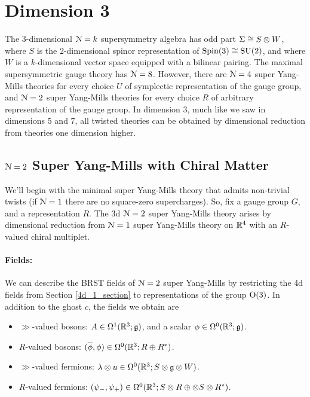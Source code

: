 \documentclass[10pt, oneside]{article}
\begin{document}

\section{Dimension 3}
The 3-dimensional $\mathcal{N}=k$ supersymmetry algebra has odd part $\Sigma \cong S \otimes W$, where $S$ is the 2-dimensional spinor representation of $\mathrm{Spin}(3) \cong \mathrm{SU}(2)$, and where $W$ is a $k$-dimensional vector space equipped with a bilinear pairing.  The maximal supersymmetric gauge theory has $\mathcal{N}=8$.  However, there are $\mathcal{N}=4$ super Yang-Mills theories for every choice $U$ of symplectic representation of the gauge group, and $\mathcal{N}=2$ super Yang-Mills theories for every choice $R$ of arbitrary representation of the gauge group.  In dimension 3, much like we saw in dimensions 5 and 7, all twisted theories can be obtained by dimensional reduction from theories one dimension higher.

\subsection{\texorpdfstring{$\mathcal N = 2$}{N=2} Super Yang-Mills with Chiral Matter} \label{3d_2_section}
We'll begin with the minimal super Yang-Mills theory that admits non-trivial twists (if $\mathcal{N}=1$ there are no square-zero supercharges).  So, fix a gauge group $G$, and a representation $R$.  The 3d $\mathcal{N}=2$ super Yang-Mills theory arises by dimensional reduction from $\mathcal{N}=1$ super Yang-Mills theory on $\mathbb R^4$ with an $R$-valued chiral multiplet.

\vspace{-10pt}
\paragraph{Fields:} We can describe the BRST fields of $\mathcal{N}=2$ super Yang-Mills by restricting the 4d fields from Section \ref{4d_1_section} to representations of the group $\mathrm{O}(3)$.  In addition to the ghost $c$, the fields we obtain are
\begin{itemize}
 \item $\gg$-valued bosons: $A \in \Omega^1(\mathbb R^3; \mathfrak{g})$, and a scalar $\phi \in \Omega^0(\mathbb R^3; \mathfrak{g})$.
 \item $R$-valued bosons: $(\overline{\phi}, \phi) \in \Omega^0(\mathbb R^3 ; R \oplus R^*)$.
 \item $\gg$-valued fermions: $\lambda \otimes u \in \Omega^0(\mathbb R^3 ; S \otimes \mathfrak{g} \otimes W)$.
 \item $R$-valued fermions: $(\psi_-,\psi_+) \in \Omega^0(\mathbb R^3 ; S \otimes R \oplus \otimes S \otimes R^*)$.
\end{itemize}
\end{document}
